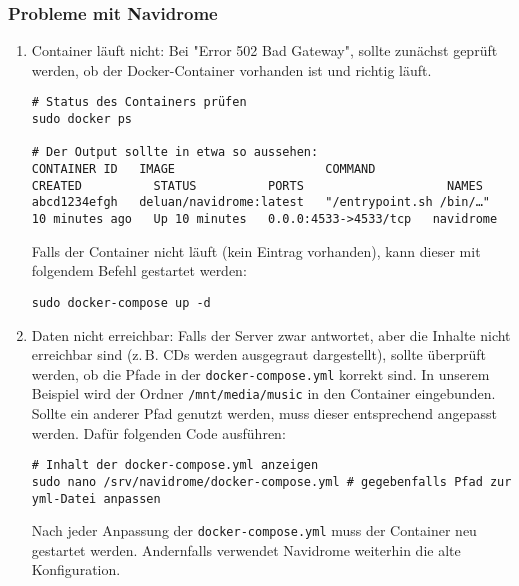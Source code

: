 \documentclass[12pt,a4paper]{report}
\begin{document}
    \subsubsection*{Probleme mit Navidrome}
    \begin{enumerate}
      \item Container läuft nicht:
      Bei "Error 502 Bad Gateway", sollte zunächst geprüft werden, ob der Docker-Container vorhanden ist und richtig läuft.

      \begin{verbatim}
# Status des Containers prüfen
sudo docker ps

# Der Output sollte in etwa so aussehen:
CONTAINER ID   IMAGE                     COMMAND                  CREATED          STATUS          PORTS                    NAMES
abcd1234efgh   deluan/navidrome:latest   "/entrypoint.sh /bin/…"   10 minutes ago   Up 10 minutes   0.0.0:4533->4533/tcp   navidrome
      \end{verbatim} 

      Falls der Container nicht läuft (kein Eintrag vorhanden), kann dieser mit folgendem Befehl gestartet werden:
      \begin{verbatim}
sudo docker-compose up -d
      \end{verbatim}

      \item Daten nicht erreichbar:
      Falls der Server zwar antwortet, aber die Inhalte nicht erreichbar sind (z.\,B. CDs werden ausgegraut dargestellt), 
      sollte überprüft werden, ob die Pfade in der \texttt{docker-compose.yml} korrekt sind.  
      In unserem Beispiel wird der Ordner \texttt{/mnt/media/music} in den Container eingebunden.  
      Sollte ein anderer Pfad genutzt werden, muss dieser entsprechend angepasst werden.
      Dafür folgenden Code ausführen:

      \begin{verbatim}
# Inhalt der docker-compose.yml anzeigen
sudo nano /srv/navidrome/docker-compose.yml # gegebenfalls Pfad zur yml-Datei anpassen
      \end{verbatim}

      Nach jeder Anpassung der \texttt{docker-compose.yml} muss der Container neu gestartet werden.  
      Andernfalls verwendet Navidrome weiterhin die alte Konfiguration.
      

\end{enumerate}
\end{document}
